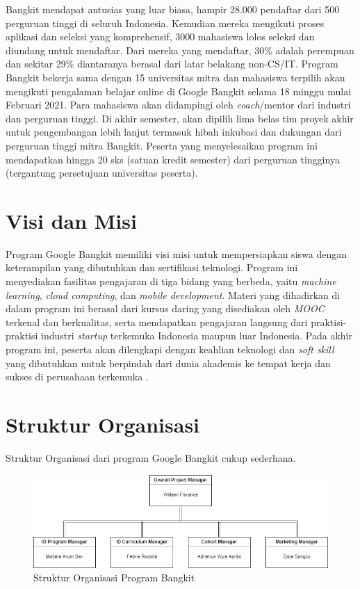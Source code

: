 Bangkit mendapat antusias yang luar biasa, hampir 28.000 pendaftar dari 500 perguruan tinggi di seluruh Indonesia.
Kemudian mereka mengikuti proses aplikasi dan seleksi yang komprehensif, 3000 mahasiswa lolos seleksi dan diundang untuk mendaftar.
Dari mereka yang mendaftar, 30\% adalah perempuan dan sekitar 29\% diantaranya berasal dari latar belakang non-CS/IT.
Program Bangkit bekerja sama dengan 15 universitas mitra dan mahasiswa terpilih akan mengikuti pengalaman belajar online di Google Bangkit selama 18 minggu mulai Februari 2021.
Para mahasiswa akan didampingi oleh \textit{coach}/mentor dari industri dan perguruan tinggi.
Di akhir semester, akan dipilih lima belas tim proyek akhir untuk pengembangan lebih lanjut termasuk hibah inkubasi dan dukungan dari perguruan tinggi mitra Bangkit.
Peserta yang menyelesaikan program ini mendapatkan hingga 20 sks (satuan kredit semester) dari perguruan tingginya (tergantung persetujuan universitas peserta).

\section{Visi dan Misi}

Program Google Bangkit memiliki visi misi untuk mempersiapkan siswa dengan keterampilan yang dibutuhkan dan sertifikasi teknologi.
Program ini menyediakan fasilitas pengajaran di tiga bidang yang berbeda, yaitu \textit{machine learning}, \textit{cloud computing}, dan \textit{mobile development}.
Materi yang dihadirkan di dalam program ini berasal dari kursus daring yang disediakan oleh \textit{MOOC} terkenal dan berkualitas, serta mendapatkan pengajaran langsung dari praktisi-praktisi industri \textit{startup} terkemuka Indonesia maupun luar Indonesia.
Pada akhir program ini, peserta akan dilengkapi dengan keahlian teknologi dan \textit{soft skill} yang dibutuhkan untuk berpindah dari dunia akademis ke tempat kerja dan sukses di perusahaan terkemuka \cite{logo}.

\section{Struktur Organisasi}

Struktur Organisasi dari program Google Bangkit cukup sederhana.

\begin{figure}[ht] \centering
  \includegraphics[scale=0.4]{gambar/struktur-organisasi.png}
  \caption{Struktur Organisasi Program Bangkit}
  \label{fig:struktur-bangkit}
\end{figure}

